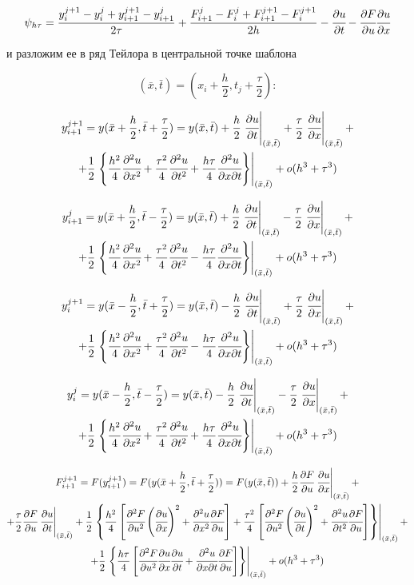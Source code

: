 \documentclass[12pt]{article}
\def\dd#1#2{\cfrac{\partial#1}{\partial#2}}
\def\ddd#1#2#3{\cfrac{\partial^2#1}{\partial#2\partial#3}}
\def\dddd#1#2{\cfrac{\partial^2#1}{\partial{#2}^2}}
\def \atxt#1{\left.#1\right|_{(\bar{x},\bar{t})}}
\begin{document}
		\begin{equation}
			\psi_{h\tau} = \frac{y^{j+1}_i - y^j_i + y^{j+1}_{i+1} - y^j_{i+1}}{2\tau} + \frac{F^j_{i+1} - F^j_i + F^{j+1}_{i+1} - F^{j+1}_i}{2h} - \dd{u}t - \dd{F}u\dd{u}x
		\end{equation}
		
		и разложим ее в ряд Тейлора в центральной точке шаблона
		
		$$(\bar{x}, \bar{t}) = (x_i + \frac{h}{2}, t_j + \frac{\tau}{2}):$$
		
		\begin{multline}
			y^{j+1}_{i+1} = y(\bar{x} + \frac{h}{2}, \bar{t} + \frac{\tau}{2}) =  y(\bar{x}, \bar{t}) + \frac{h}{2}\atxt{\dd{u}t} + \frac{\tau}{2}\atxt{\dd{u}x} +\\
			+ \frac{1}{2}\atxt{\left\{ \frac{h^2}{4}\dddd{u}x + \frac{\tau^2}{4}\dddd{u}t + \frac{h\tau}{4}\ddd{u}{x}t \right\}} + o(h^3 + \tau^3)
		\end{multline}
		
		\begin{multline}
			y^{j}_{i+1} = y(\bar{x} + \frac{h}{2}, \bar{t} - \frac{\tau}{2}) =  y(\bar{x}, \bar{t}) + \frac{h}{2}\atxt{\dd{u}t} - \frac{\tau}{2}\atxt{\dd{u}x} +\\
			+ \frac{1}{2}\atxt{\left\{ \frac{h^2}{4}\dddd{u}x + \frac{\tau^2}{4}\dddd{u}t - \frac{h\tau}{4}\ddd{u}{x}t \right\}} + o(h^3 + \tau^3)
		\end{multline}
		
		\begin{multline}
			y^{j+1}_{i} = y(\bar{x} - \frac{h}{2}, \bar{t} + \frac{\tau}{2}) =  y(\bar{x}, \bar{t}) - \frac{h}{2}\atxt{\dd{u}t} + \frac{\tau}{2}\atxt{\dd{u}x} +\\
			+ \frac{1}{2}\atxt{\left\{ \frac{h^2}{4}\dddd{u}x + \frac{\tau^2}{4}\dddd{u}t - \frac{h\tau}{4}\ddd{u}{x}t \right\}} + o(h^3 + \tau^3)
		\end{multline}
		
		\begin{multline}
			y^{j}_{i} = y(\bar{x} - \frac{h}{2}, \bar{t} - \frac{\tau}{2}) =  y(\bar{x}, \bar{t}) - \frac{h}{2}\atxt{\dd{u}t} - \frac{\tau}{2}\atxt{\dd{u}x} +\\
			+ \frac{1}{2}\atxt{\left\{ \frac{h^2}{4}\dddd{u}x + \frac{\tau^2}{4}\dddd{u}t + \frac{h\tau}{4}\ddd{u}{x}t \right\}} + o(h^3 + \tau^3)
		\end{multline}

		\begin{multline}
			F^{j+1}_{i+1} = F(y^{j+1}_{i+1}) = F(y(\bar{x} + \frac{h}{2}, \bar{t} + \frac{\tau}{2})) =  F(y(\bar{x}, \bar{t})) + \frac{h}{2}\dd{F}u\atxt{\dd{u}x} + \\
			+\frac{\tau}{2}\dd{F}u\atxt{\dd{u}t} + \frac{1}{2}\atxt{\left\{ \frac{h^2}{4}\left[ \dddd{F}u \left( \dd{u}x\right)^2 + \dddd{u}x\dd{F}u \right] + \frac{\tau^2}{4}\left[ \dddd{F}u\left( \dd{u}t \right)^2 + \dddd{u}t\dd{F}u \right] \right\}}+\\
			+ \frac{1}{2}\atxt{\left\{ \frac{h\tau}{4}\left[ \dddd{F}u\dd{u}x\dd{u}t + \ddd{u}{x}t\dd{F}u \right] \right\}} + o(h^3 + \tau^3)
		\end{multline}
		
\end{document}
